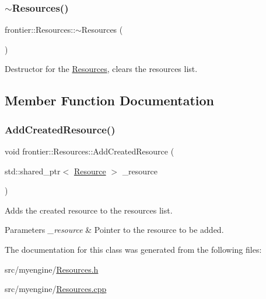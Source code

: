 \subsubsection{\texorpdfstring{$\sim$\+Resources()}{~Resources()}}
{\footnotesize\ttfamily frontier\+::\+Resources\+::$\sim$\+Resources (\begin{DoxyParamCaption}{ }\end{DoxyParamCaption})}



Destructor for the \hyperlink{classfrontier_1_1_resources}{Resources}, clears the resources list. 



\subsection{Member Function Documentation}
\mbox{\label{classfrontier_1_1_resources_a34e0df1d6b935644bccee94ebe600a4a}} 
\subsubsection{\texorpdfstring{Add\+Created\+Resource()}{AddCreatedResource()}}
{\footnotesize\ttfamily void frontier\+::\+Resources\+::\+Add\+Created\+Resource (\begin{DoxyParamCaption}\item[{std\+::shared\+\_\+ptr$<$ \hyperlink{classfrontier_1_1_resource}{Resource} $>$}]{\+\_\+resource }\end{DoxyParamCaption})}



Adds the created resource to the resources list. 


\begin{DoxyParams}{Parameters}
{\em \+\_\+resource} & Pointer to the resource to be added. \\
\hline
\end{DoxyParams}


The documentation for this class was generated from the following files\+:\begin{DoxyCompactItemize}
\item 
src/myengine/\hyperlink{_resources_8h}{Resources.\+h}\item 
src/myengine/\hyperlink{_resources_8cpp}{Resources.\+cpp}\end{DoxyCompactItemize}
